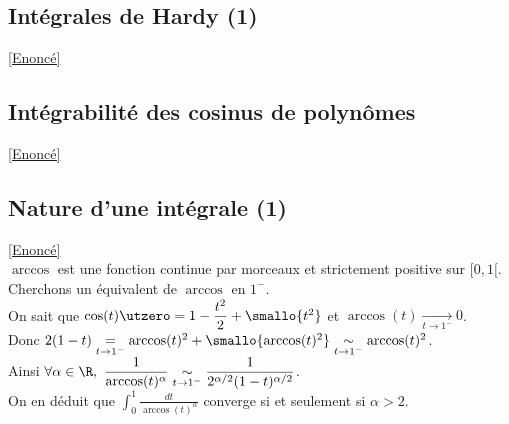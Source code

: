 \documentclass{book}
\begin{document}
	\subsection{Intégrales de Hardy (1)}
	\label{Intégrales de Hardy (1) corrigé}
	\textcolor{blue}{\hyperref[Intégrales de Hardy (1)]{[Enoncé]}}\\
	
	\subsection{Intégrabilité des cosinus de polynômes}
	\label{Intégrabilité des cosinus de polynômes corrigé}
	\textcolor{blue}{\hyperref[Intégrabilité des cosinus de polynômes]{[Enoncé]}}\\
	
	\subsection{Nature d'une intégrale (1) }
	\label{Nature d'une intégrale (1) corrigé}
	\textcolor{blue}{\hyperref[Nature d'une intégrale (1)]{[Enoncé]}}\\
	$\arccos$ est une fonction continue par morceaux et strictement positive sur $[0,1[$. Cherchons un équivalent de $\arccos$ en $1^-$.\\
	On sait que $\cos(t)\utzero=1-\dfrac{t^2}{2}+\smallo{t^2}$ et $\arccos(t)\underset{t\to 1^-}\longrightarrow 0$.\\
	Donc $2(1-t)\underset{t\to 1^-}=\arccos(t)^2+\smallo{\arccos(t)^2}\underset{t\to 1^-}\sim\arccos(t)^2$.\\
	Ainsi $\forall \alpha\in \R,\ \displaystyle\frac{1}{\arccos(t)^\alpha}\underset{t\to 1^-}\sim\frac{1}{2^{\alpha/2}(1-t)^{\alpha/2}}$.\\
	On en déduit que $\displaystyle\int_0^1\frac{dt}{\arccos(t)^\alpha}$ converge si et seulement si $\alpha>2$.
	
\end{document}
